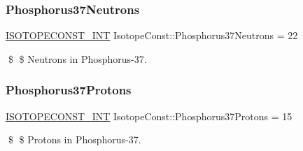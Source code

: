 \subsubsection{\texorpdfstring{Phosphorus37\+Neutrons}{Phosphorus37Neutrons}}
{\footnotesize\ttfamily \mbox{\hyperlink{group___isotope_const-_macros_ga5f18360b3e99483a35c32d789e62621c}{I\+S\+O\+T\+O\+P\+E\+C\+O\+N\+S\+T\+\_\+\+I\+NT}} Isotope\+Const\+::\+Phosphorus37\+Neutrons = 22}

\$ \$ Neutrons in Phosphorus-\/37. \mbox{\label{group___isotope_const-_phosphorus-_p37_ga5bf399d994aad613423c36329c9fce29}} 
\subsubsection{\texorpdfstring{Phosphorus37\+Protons}{Phosphorus37Protons}}
{\footnotesize\ttfamily \mbox{\hyperlink{group___isotope_const-_macros_ga5f18360b3e99483a35c32d789e62621c}{I\+S\+O\+T\+O\+P\+E\+C\+O\+N\+S\+T\+\_\+\+I\+NT}} Isotope\+Const\+::\+Phosphorus37\+Protons = 15}

\$ \$ Protons in Phosphorus-\/37. 